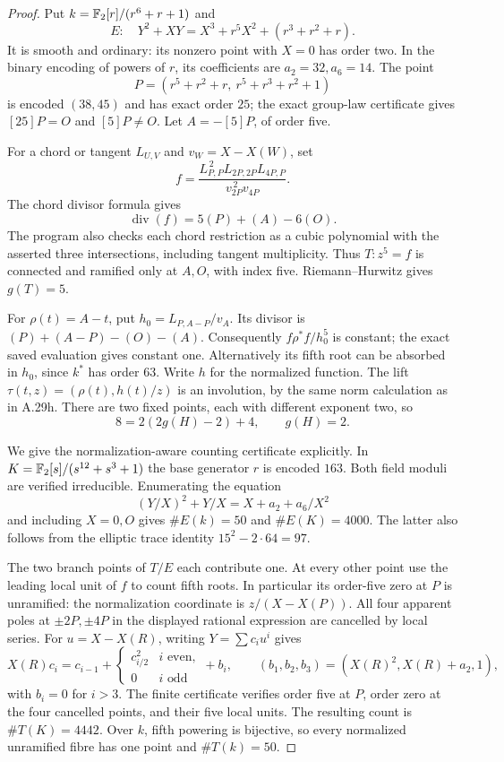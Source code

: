 \begin{proof}
Put $k=\mathbb F_2[r]/(r^6+r+1)$ and
\[
 E:\quad Y^2+XY=X^3+r^5X^2+(r^3+r^2+r).
\]
It is smooth and ordinary: its nonzero point with $X=0$
has order two. In the binary encoding of powers of $r$,
its coefficients are $a_2=32,a_6=14$. The point
\[
 P=(r^5+r^2+r,\ r^5+r^3+r^2+1)
\]
is encoded $(38,45)$ and has exact order $25$;
the exact group-law certificate gives $[25]P=O$ and
$[5]P\ne O$. Let $A=-[5]P$, of order five.

For a chord or tangent $L_{U,V}$ and
$v_W=X-X(W)$, set
\[
 f=\frac{L_{P,P}^{\,2}L_{2P,2P}L_{4P,P}}
          {v_{2P}^{\,2}v_{4P}}.
\]
The chord divisor formula gives
\[
 \operatorname{div}(f)=5(P)+(A)-6(O).                    \tag{A.47}
\]
The program also checks each chord restriction as a
cubic polynomial with the asserted three intersections,
including tangent multiplicity. Thus $T:z^5=f$ is
connected and ramified only at $A,O$, with index five.
Riemann--Hurwitz gives $g(T)=5$.

For $\rho(t)=A-t$, put $h_0=L_{P,A-P}/v_A$.
Its divisor is $(P)+(A-P)-(O)-(A)$. Consequently
$f\rho^*f/h_0^5$ is constant; the exact saved evaluation
gives constant one. Alternatively its fifth root can
be absorbed in $h_0$, since $k^*$ has order $63$.
Write $h$ for the normalized function. The lift
$\tau(t,z)=(\rho(t),h(t)/z)$ is an involution, by the
same norm calculation as in A.29h. There are two
fixed points, each with different exponent two, so
\[
 8=2(2g(H)-2)+4,\qquad g(H)=2.
\]

We give the normalization-aware counting certificate
explicitly. In
$K=\mathbb F_2[s]/(s^{12}+s^3+1)$ the base generator $r$ is
encoded $163$. Both field moduli are verified
irreducible. Enumerating the equation
\[
 (Y/X)^2+Y/X=X+a_2+a_6/X^2
\]
and including $X=0,O$ gives $\#E(k)=50$ and
$\#E(K)=4000$. The latter also follows from the
elliptic trace identity $15^2-2\cdot64=97$.

The two branch points of $T/E$ each contribute one.
At every other point use the leading local unit of
$f$ to count fifth roots. In particular its order-five
zero at $P$ is unramified: the normalization coordinate
is $z/(X-X(P))$. All four apparent poles at
$\pm2P,\pm4P$ in the displayed rational expression
are cancelled by local series. For
$u=X-X(R)$, writing $Y=\sum c_i u^i$ gives
\[
 X(R)c_i=c_{i-1}+
 \begin{cases}c_{i/2}^2&i\text{ even},\\0&i\text{ odd}\end{cases}
 +b_i,\qquad
 (b_1,b_2,b_3)=(X(R)^2,X(R)+a_2,1),
\]
with $b_i=0$ for $i>3$.
The finite certificate verifies order five at $P$,
order zero at the four cancelled points, and their
five local units. The resulting count is
$\#T(K)=4442$. Over $k$, fifth powering is bijective,
so every normalized unramified fibre has one point
and $\#T(k)=50$.


\end{proof}
